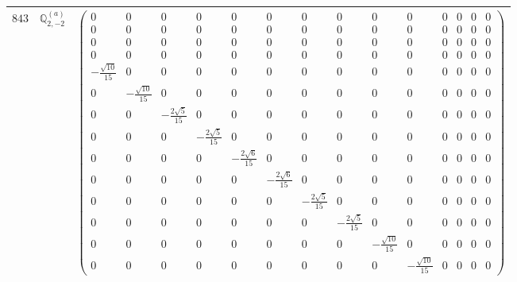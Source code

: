 \documentclass[fleqn,8pt,landscape]{jsarticle}
\begin{document}
\begin{center}
\begin{longtable}{ccc}
$ 843 $ & $ \mathbb{Q}_{2,-2}^{(a)} $ & $ \begin{pmatrix} 0 & 0 & 0 & 0 & 0 & 0 & 0 & 0 & 0 & 0 & 0 & 0 & 0 & 0 \\ 0 & 0 & 0 & 0 & 0 & 0 & 0 & 0 & 0 & 0 & 0 & 0 & 0 & 0 \\ 0 & 0 & 0 & 0 & 0 & 0 & 0 & 0 & 0 & 0 & 0 & 0 & 0 & 0 \\ 0 & 0 & 0 & 0 & 0 & 0 & 0 & 0 & 0 & 0 & 0 & 0 & 0 & 0 \\ - \frac{\sqrt{10}}{15} & 0 & 0 & 0 & 0 & 0 & 0 & 0 & 0 & 0 & 0 & 0 & 0 & 0 \\ 0 & - \frac{\sqrt{10}}{15} & 0 & 0 & 0 & 0 & 0 & 0 & 0 & 0 & 0 & 0 & 0 & 0 \\ 0 & 0 & - \frac{2 \sqrt{5}}{15} & 0 & 0 & 0 & 0 & 0 & 0 & 0 & 0 & 0 & 0 & 0 \\ 0 & 0 & 0 & - \frac{2 \sqrt{5}}{15} & 0 & 0 & 0 & 0 & 0 & 0 & 0 & 0 & 0 & 0 \\ 0 & 0 & 0 & 0 & - \frac{2 \sqrt{6}}{15} & 0 & 0 & 0 & 0 & 0 & 0 & 0 & 0 & 0 \\ 0 & 0 & 0 & 0 & 0 & - \frac{2 \sqrt{6}}{15} & 0 & 0 & 0 & 0 & 0 & 0 & 0 & 0 \\ 0 & 0 & 0 & 0 & 0 & 0 & - \frac{2 \sqrt{5}}{15} & 0 & 0 & 0 & 0 & 0 & 0 & 0 \\ 0 & 0 & 0 & 0 & 0 & 0 & 0 & - \frac{2 \sqrt{5}}{15} & 0 & 0 & 0 & 0 & 0 & 0 \\ 0 & 0 & 0 & 0 & 0 & 0 & 0 & 0 & - \frac{\sqrt{10}}{15} & 0 & 0 & 0 & 0 & 0 \\ 0 & 0 & 0 & 0 & 0 & 0 & 0 & 0 & 0 & - \frac{\sqrt{10}}{15} & 0 & 0 & 0 & 0 \end{pmatrix} $ \\ \hline

\end{longtable}
\end{center}
\end{document}
